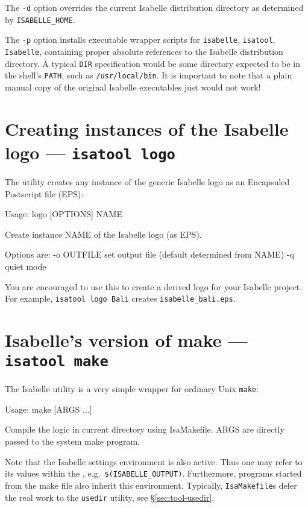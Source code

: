 The \texttt{-d} option overrides the current Isabelle distribution directory
as determined by \texttt{ISABELLE_HOME}.

The \texttt{-p} option installs executable wrapper scripts for
\texttt{isabelle}, \texttt{isatool}, \texttt{Isabelle}, containing proper
absolute references to the Isabelle distribution directory.  A typical
\texttt{DIR} specification would be some directory expected to be in the
shell's \texttt{PATH}, such as \texttt{/usr/local/bin}.  It is important to
note that a plain manual copy of the original Isabelle executables just would
not work!


\section{Creating instances of the Isabelle logo --- \texttt{isatool
    logo}}

The  utility creates any instance of the generic Isabelle logo as
an Encapsuled Postscript file (EPS):
\begin{ttbox}
Usage: logo [OPTIONS] NAME

  Create instance NAME of the Isabelle logo (as EPS).

  Options are:
    -o OUTFILE   set output file (default determined from NAME)
    -q           quiet mode
\end{ttbox}
You are encouraged to use this to create a derived logo for your Isabelle
project.  For example, \texttt{isatool logo Bali} creates
\texttt{isabelle_bali.eps}.


\section{Isabelle's version of make --- \texttt{isatool make}}
\label{sec:tool-make}

The Isabelle  utility is a very simple wrapper for
ordinary Unix \texttt{make}:
\begin{ttbox}
Usage: make [ARGS ...]

  Compile the logic in current directory using IsaMakefile.
  ARGS are directly passed to the system make program.
\end{ttbox}
Note that the Isabelle settings environment is also active. Thus one
may refer to its values within the , e.g.\ 
\texttt{\$(ISABELLE_OUTPUT)}. Furthermore, programs started from the
make file also inherit this environment.  Typically,
\texttt{IsaMakefile}s defer the real work to the \texttt{usedir}
utility, see \S\ref{sec:tool-usedir}.

